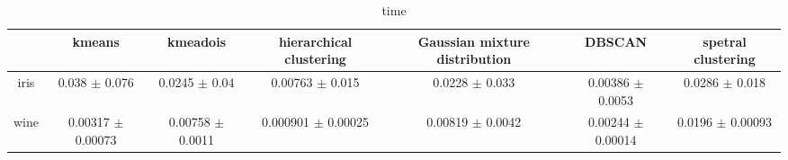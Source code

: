 \begin{table}
\centering
\begin{tabular}{ccccccc}
\toprule
 & kmeans & kmeadois & hierarchical clustering & Gaussian mixture distribution & DBSCAN & spetral clustering \\
\midrule
iris & 0.038 $\pm$ 0.076 & 0.0245 $\pm$ 0.04 & 0.00763 $\pm$ 0.015 & 0.0228 $\pm$ 0.033 & 0.00386 $\pm$ 0.0053 & 0.0286 $\pm$ 0.018 \\
wine & 0.00317 $\pm$ 0.00073 & 0.00758 $\pm$ 0.0011 & 0.000901 $\pm$ 0.00025 & 0.00819 $\pm$ 0.0042 & 0.00244 $\pm$ 0.00014 & 0.0196 $\pm$ 0.00093 \\
\bottomrule
\end{tabular}
\caption{time}
\label{table:time}
\end{table}
